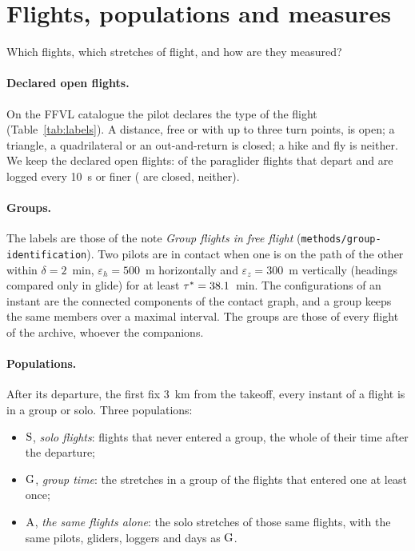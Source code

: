 \section{Flights, populations and measures}\label{sec:flights}

Which flights, which stretches of flight, and how are they measured?

\paragraph{Declared open flights.} On the FFVL catalogue the pilot declares the type of the flight
(Table~\ref{tab:labels}). A distance, free or with up to three turn points, is open; a triangle, a
quadrilateral or an out-and-return is closed; a hike and fly is neither. We keep the declared open flights:
\FlightsOpen{} of the \FlightsAll{} paraglider flights that depart and are logged every 10~s or finer
(\FlightsClosed{} are closed, \FlightsNeither{} neither).

\begin{table}
\centering\small

\caption{The labels of the FFVL catalogue, their class and their flights (paragliders that depart, logged
every 10~s or finer).}
\label{tab:labels}
\end{table}

\paragraph{Groups.} The labels are those of the note \emph{Group flights in free flight}
(\texttt{methods/group-identification}). Two pilots are in contact when one is on the path of the
other within $\delta=2$~min, $\varepsilon_h=500$~m horizontally and $\varepsilon_z=300$~m vertically
(headings compared only in glide) for at least $\tau^*=38.1$~min. The configurations of an instant
are the connected components of the contact graph, and a group keeps the same members over a maximal
interval. The groups are those of every flight of the archive, whoever the companions.

\paragraph{Populations.} After its departure, the first fix 3~km from the takeoff, every instant of a
flight is in a group or solo. Three populations:
\begin{itemize}
  \item $\mathrm{S}$, \emph{solo flights}: flights that never entered a group, the whole of their time after
        the departure;
  \item $\mathrm{G}$, \emph{group time}: the stretches in a group of the flights that entered one at least once;
  \item $\mathrm{A}$, \emph{the same flights alone}: the solo stretches of those same flights, with the same pilots,
        gliders, loggers and days as $\mathrm{G}$.
\end{itemize}

